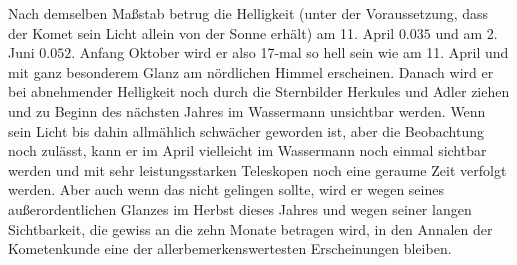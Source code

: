 \par\indent Nach demselben Maßstab betrug die Helligkeit (unter der Voraussetzung, dass der Komet sein Licht allein von der Sonne erhält) am 11. April $0.035$ und am 2. Juni $0.052$. Anfang Oktober wird er also 17-mal so hell sein wie am 11. April und mit ganz besonderem Glanz am nördlichen Himmel erscheinen. Danach wird er bei abnehmender Helligkeit noch durch die Sternbilder Herkules und Adler ziehen und zu Beginn des nächsten Jahres im Wassermann unsichtbar werden. Wenn sein Licht bis dahin allmählich schwächer geworden ist, aber die Beobachtung noch zulässt, kann er im April vielleicht im Wassermann noch einmal sichtbar werden und mit sehr leistungsstarken Teleskopen noch eine geraume Zeit verfolgt werden. Aber auch wenn das nicht gelingen sollte, wird er wegen seines außerordentlichen Glanzes im Herbst dieses Jahres und wegen seiner langen Sichtbarkeit, die gewiss an die zehn Monate betragen wird, in den Annalen der Kometenkunde eine der allerbemerkenswertesten Erscheinungen bleiben.

